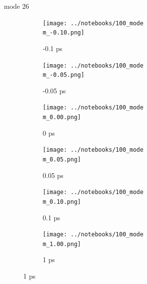 \documentclass{beamer}
\begin{document}
\renewcommand\m{26}
\begin{frame}{mode \m}
	\begin{figure}
		\centering
		\begin{subfigure}[b]{\w\textwidth}
			\centering
			\texttt{[image: ../notebooks/100\_mode\\m\_-0.10.png]}
			\caption{-0.1 ps}
		\end{subfigure}
		\begin{subfigure}[b]{\w\textwidth}
			\centering
			\texttt{[image: ../notebooks/100\_mode\\m\_-0.05.png]}
			\caption{-0.05 ps}
		\end{subfigure}
		\begin{subfigure}[b]{\w\textwidth}
			\centering
			\texttt{[image: ../notebooks/100\_mode\\m\_0.00.png]}
			\caption{0 ps}
		\end{subfigure}
		\begin{subfigure}[b]{\w\textwidth}
			\centering
			\texttt{[image: ../notebooks/100\_mode\\m\_0.05.png]}
			\caption{0.05 ps}
		\end{subfigure}
		\begin{subfigure}[b]{\w\textwidth}
			\centering
			\texttt{[image: ../notebooks/100\_mode\\m\_0.10.png]}
			\caption{0.1 ps}
		\end{subfigure}
		\begin{subfigure}[b]{\w\textwidth}
			\centering
			\texttt{[image: ../notebooks/100\_mode\\m\_1.00.png]}
			\caption{1 ps}
		\end{subfigure}
	\end{figure}
\end{frame}
\end{document}

